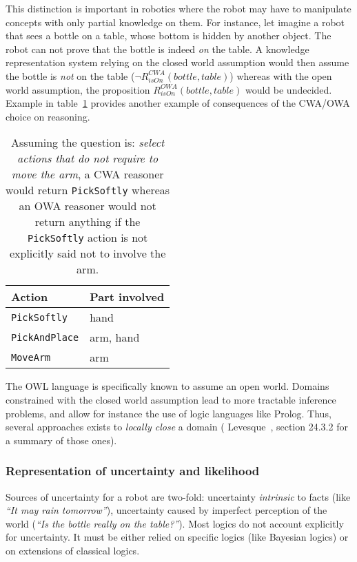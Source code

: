 This distinction is important in robotics where the robot may have to manipulate
concepts with only partial knowledge on them. For instance, let imagine a robot
that sees a bottle on a table, whose bottom is hidden by another object. The
robot can not prove that the bottle is indeed \emph{on} the table. A knowledge
representation system relying on the closed world assumption would then assume
the bottle is \emph{not} on the table ($\lnot R^{CWA}_{isOn}(bottle, table)$)
whereas with the open world assumption, the proposition $R^{OWA}_{isOn}(bottle,
table)$ would be undecided. Example in table~\ref{table|cwa-owa-example} provides
another example of consequences of the CWA/OWA choice on reasoning.

\begin{table}
    \begin{center}
    \begin{tabular}{ll}
    {\bf Action} & {\bf Part involved} \\
    \hline
    {\tt PickSoftly} & hand \\
    {\tt PickAndPlace} & arm, hand \\
    {\tt MoveArm} & arm \\
    \hline
    \end{tabular}
    \end{center}
    \caption{Assuming the question is: \emph{select actions that do not require
    to move the arm}, a CWA reasoner would return {\tt PickSoftly} whereas an
    OWA reasoner would not return anything if the {\tt PickSoftly} action is
    not explicitly said not to involve the arm.}
    \label{table|cwa-owa-example}
\end{table}

The OWL language is specifically known to assume an open world.  Domains
constrained with the closed world assumption lead to more tractable inference
problems, and allow for instance the use of logic languages like Prolog. Thus,
several approaches exists to \emph{locally close} a domain (\cf
Levesque~\cite{Levesque2008}, section 24.3.2 for a summary of those ones).

\subsubsection{Representation of uncertainty and likelihood}

Sources of uncertainty for a robot are two-fold: uncertainty \emph{intrinsic}
to facts (like \emph{``It may rain tomorrow''}), uncertainty caused by
imperfect perception of the world (\emph{``Is the bottle really on the
table?''}). Most logics do not account explicitly for uncertainty. It must be
either relied on specific logics (like Bayesian logics) or on extensions of
classical logics.

